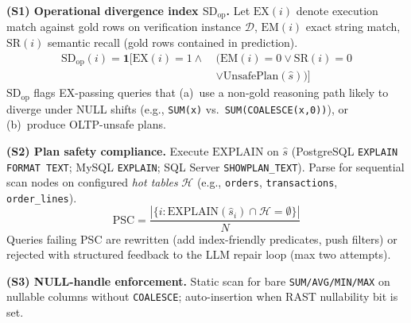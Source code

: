 \documentclass[twocolumn]{svjour3}
\begin{document}
\textbf{(S1) Operational divergence index $\text{SD}_{\text{op}}$.}
Let $\text{EX}(i)$ denote execution match against gold rows on verification instance $\mathcal{D}$, $\text{EM}(i)$ exact string match, $\text{SR}(i)$ semantic recall (gold rows contained in prediction).
\begin{equation}
\begin{split}
  \text{SD}_{\text{op}}(i) = \mathbf{1}[\text{EX}(i){=}1 \land\ &(\text{EM}(i){=}0 \lor \text{SR}(i){=}0 \\
  &\lor \text{UnsafePlan}(\hat{s}))]
\end{split}
\end{equation}
$\text{SD}_{\text{op}}$ flags EX-passing queries that (a)~use a non-gold reasoning path likely to diverge under NULL shifts (e.g., \texttt{SUM(x)} vs.\ \texttt{SUM(COALESCE(x,0))}), or (b)~produce OLTP-unsafe plans.

\textbf{(S2) Plan safety compliance.}
Execute $\text{EXPLAIN}$ on $\hat{s}$ (PostgreSQL \texttt{EXPLAIN FORMAT TEXT}; MySQL \texttt{EXPLAIN}; SQL Server \texttt{SHOWPLAN\_TEXT}).
Parse for sequential scan nodes on configured \emph{hot tables} $\mathcal{H}$ (e.g., \texttt{orders}, \texttt{transactions}, \texttt{order\_lines}).
\begin{equation}
  \text{PSC} = \frac{|\{i : \text{EXPLAIN}(\hat{s}_i)\cap \mathcal{H} = \emptyset\}|}{N}
\end{equation}
Queries failing PSC are rewritten (add index-friendly predicates, push filters) or rejected with structured feedback to the LLM repair loop (max two attempts).

\textbf{(S3) NULL-handle enforcement.}
Static scan for bare \texttt{SUM/AVG/MIN/MAX} on nullable columns without \texttt{COALESCE}; auto-insertion when RAST nullability bit is set.
\end{document}
